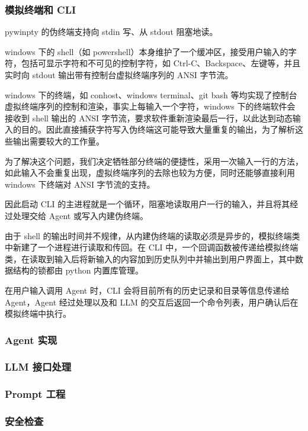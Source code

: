 \documentclass{article}
\theoremstyle{plain}
\theoremstyle{definition}
\theoremstyle{remark}
\begin{document}
\subsubsection{模拟终端和 CLI}

pywinpty 的伪终端支持向 stdin 写、从 stdout 阻塞地读。

windows 下的 shell（如 powershell）本身维护了一个缓冲区，接受用户输入的字符，包括可显示字符和不可见的控制字符，如 Ctrl-C、Backspace、左键等，并且实时向 stdout 输出带有控制台虚拟终端序列的 ANSI 字节流。

windows 下的终端，如 conhost、windows terminal、git bash 等均实现了控制台虚拟终端序列的控制和渲染，事实上每输入一个字符，windows 下的终端软件会接收到 shell 输出的 ANSI 字节流，要求软件重新渲染最后一行，以此达到动态输入的目的。因此直接捕获字符写入伪终端这可能导致大量重复的输出，为了解析这些输出需要较大的工作量。

为了解决这个问题，我们决定牺牲部分终端的便捷性，采用一次输入一行的方法，如此输入不会重复出现，虚拟终端序列的去除也较为方便，同时还能够直接利用 windows 下终端对 ANSI 字节流的支持。

因此启动 CLI 的主进程就是一个循环，阻塞地读取用户一行的输入，并且将其经过处理交给 Agent 或写入内建伪终端。

由于 shell 的输出时间并不规律，从内建伪终端的读取必须是异步的，模拟终端类中新建了一个进程进行读取和传回。在 CLI 中，一个回调函数被传递给模拟终端类，在读取到输入后将新输入的内容加到历史队列中并输出到用户界面上，其中数据结构的锁都由 python 内置库管理。

在用户输入调用 Agent 时，CLI 会将目前所有的历史记录和目录等信息传递给 Agent，Agent 经过处理以及和 LLM 的交互后返回一个命令列表，用户确认后在模拟终端中执行。

\subsubsection{Agent 实现}

\subsubsection{LLM 接口处理}

\subsubsection{Prompt 工程}

\subsubsection{安全检查}
\end{document}
